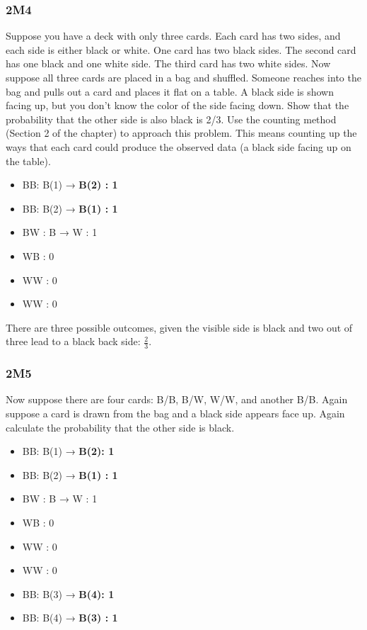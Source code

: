 \documentclass[
]{book}
\providecommand{\tightlist}{%
  \setlength{\itemsep}{0pt}\setlength{\parskip}{0pt}}
\begin{document}
\hypertarget{m4}{%
\subsubsection*{2M4}\label{m4}}

Suppose you have a deck with only three cards. Each card has two sides, and each side is either black or white. One card has two black sides. The second card has one black and one white side. The third card has two white sides. Now suppose all three cards are placed in a bag and shuffled. Someone reaches into the bag and pulls out a card and places it flat on a table. A black side is shown facing up, but you don't know the color of the side facing down. Show that the probability that the other side is also black is 2/3. Use the counting method (Section 2 of the chapter) to approach this problem. This means counting up the ways that each card could produce the observed data (a black side facing up on the table).

\begin{itemize}
\tightlist
\item
  B\textbar B: B(1) → \textbf{B(2) : 1}
\item
  B\textbar B: B(2) → \textbf{B(1) : 1}
\item
  B\textbar W : B → W : 1
\item
  W\textbar B : 0
\item
  W\textbar W : 0
\item
  W\textbar W : 0
\end{itemize}

There are three possible outcomes, given the visible side is black and two out of three lead to a black back side: \(\frac{2}{3}\).

\hypertarget{m5}{%
\subsubsection*{2M5}\label{m5}}

Now suppose there are four cards: B/B, B/W, W/W, and another B/B. Again suppose a card is drawn from the bag and a black side appears face up. Again calculate the probability that the other side is black.

\begin{itemize}
\tightlist
\item
  B\textbar B: B(1) → \textbf{B(2): 1}
\item
  B\textbar B: B(2) → \textbf{B(1) : 1}
\item
  B\textbar W : B → W : 1
\item
  W\textbar B : 0
\item
  W\textbar W : 0
\item
  W\textbar W : 0
\item
  B\textbar B: B(3) → \textbf{B(4): 1}
\item
  B\textbar B: B(4) → \textbf{B(3) : 1}
\end{itemize}
\end{document}
